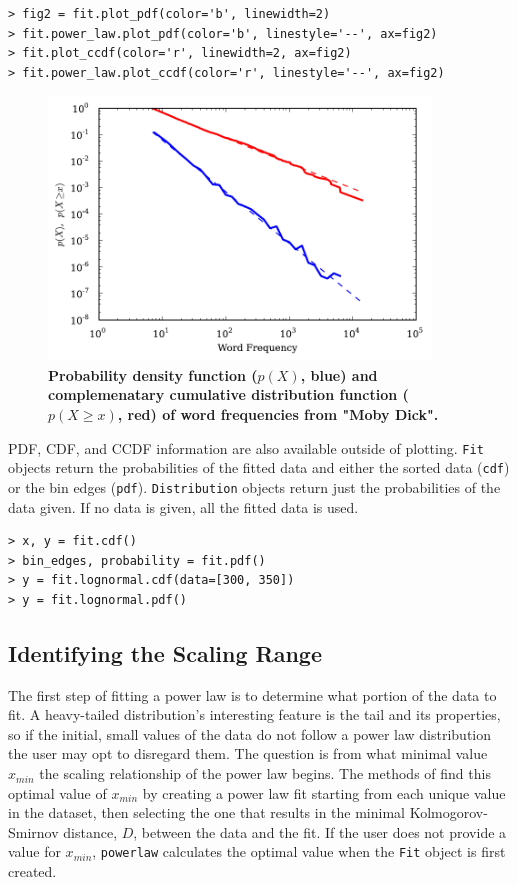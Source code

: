 \documentclass[10pt]{article}
\begin{document}
\begin{verbatim}
> fig2 = fit.plot_pdf(color='b', linewidth=2)
> fit.power_law.plot_pdf(color='b', linestyle='--', ax=fig2)
> fit.plot_ccdf(color='r', linewidth=2, ax=fig2)
> fit.power_law.plot_ccdf(color='r', linestyle='--', ax=fig2)
\end{verbatim}

\begin{figure}[!ht]
\begin{center}
\includegraphics[width=4in]{FigCCDF.pdf}
\end{center}
\caption{
{\bf Probability density function ($p(X)$, blue) and complemenatary cumulative distribution function ($p(X\geq x)$, red) of word frequencies from "Moby Dick".}
}
\label{CCDF}
\end{figure}

PDF, CDF, and CCDF information are also available outside of plotting. \verb"Fit" objects return the probabilities of the fitted data and either the sorted data (\verb"cdf") or the bin edges (\verb"pdf"). \verb"Distribution" objects return just the probabilities of the data given. If no data is given, all the fitted data is used.

\begin{verbatim}
> x, y = fit.cdf()
> bin_edges, probability = fit.pdf()
> y = fit.lognormal.cdf(data=[300, 350])
> y = fit.lognormal.pdf()
\end{verbatim}

\subsection*{Identifying the Scaling Range}
The first step of fitting a power law is to determine what portion of the data to fit. A heavy-tailed distribution's interesting feature is the tail and its properties, so if the initial, small values of the data do not follow a power law distribution the user may opt to disregard them. The question is from what minimal value $x_{min}$ the scaling relationship of the power law begins. The methods of \cite{Clauset2009} find this optimal value of $x_{min}$ by creating a power law fit starting from each unique value in the dataset, then selecting the one that results in the minimal Kolmogorov-Smirnov distance, $D$, between the data and the fit. If the user does not provide a value for $x_{min}$, \verb$powerlaw$ calculates the optimal value when the \verb$Fit$ object is first created. 
\end{document}
